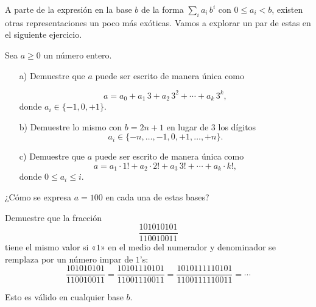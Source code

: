A parte de la expresión en la base $b$ de la forma $\sum_i a_i\,b^i$ con
$0 \le a_i < b$, existen otras representaciones un poco más exóticas. Vamos a
explorar un par de estas en el siguiente ejercicio.

\begin{ejercicio}
  Sea $a \ge 0$ un número entero.

  \begin{enumerate}
  \item[a)] Demuestre que $a$ puede ser escrito de manera única como

    $$a = a_0 + a_1\,3 + a_2\,3^2 + \cdots + a_k\,3^k,$$
    donde $a_i \in \{ -1, 0, +1 \}$.

  \item[b)] Demuestre lo mismo con $b = 2n+1$ en lugar de $3$ los dígitos
    $$a_i \in \{ -n, \ldots, -1, 0, +1, \ldots, +n \}.$$

  \item[c)] Demuestre que $a$ puede ser escrito de manera única como
    $$a = a_1\cdot 1! + a_2\cdot 2! + a_3\,3! + \cdots + a_k\cdot k!,$$
    donde $0 \le a_i \le i$.
  \end{enumerate}

  ¿Cómo se expresa $a = 100$ en cada una de estas bases?
\end{ejercicio}

\begin{ejercicio}[N.\,Anning]
  Demuestre que la fracción
  $$\frac{101010101}{110010011}$$
  tiene el mismo valor si «$1$» en el medio del numerador y denominador se
  remplaza por un número impar de $1$'s:
  \[
    \frac{101010101}{110010011} =
    \frac{10101110101}{11001110011} =
    \frac{1010111110101}{1100111110011} = \cdots
  \]

  Esto es válido en cualquier base $b$.
\end{ejercicio}


